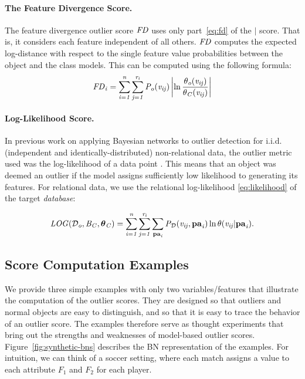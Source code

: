 {\paragraph{The Feature Divergence Score.}
The feature divergence outlier score $\it{FD}$ uses only part~\eqref{eq:fd} of the $\mid$ score. That is, it considers each feature independent of all others.  $\it{FD}$ computes the expected log-distance with respect to  the single feature value probabilities between the object and the class models. This can be computed using the following formula:
\begin{equation}
\it{FD}_{i}	=\sum_{i=1}^{n}\sum_{j=1}^{r_{i}} P_{o}( v_{ij}) \left|\ln \frac{\theta_{o}( v_{ij})}{\theta_{C}( v_{ij})}\right|
\end{equation}


\paragraph{Log-Likelihood Score.} 

In previous work on applying Bayesian networks to outlier detection for i.i.d. (independent and identically-distributed) non-relational data, the outlier metric used was the log-likelihood of a data point \cite{Cansado2008}. This means that an object was deemed an outlier if the model assigns sufficiently low likelihood to generating its features. For relational data, we use the relational log-likelihood \eqref{eq:likelihood} of the target {\em database}:

\begin{equation} \label{eq:loglikelihood-score}
\it{LOG}(\mathcal{D}_{o},B_{C},\boldsymbol{\theta}_{C}) =   \sum_{i=1}^{n}\sum_{j=1}^{r_{i}} \sum_{\mathbf{pa}_{i}}P_{\mathcal{D}}(v_{ij},\mathbf{pa}_{i})\ln \theta(v_{ij}|\mathbf{pa}_{i}).
\end{equation}




\subsection{Score Computation Examples} \label{sec:divergence-examples} 
			
			
			We provide three simple examples with only two variables/features that illustrate the computation of the outlier scores. They are designed so that outliers and normal objects are easy to distinguish, and so that it is easy to trace the behavior of an outlier score.
			The examples therefore serve as thought experiments that bring out the strengths and weaknesses of model-based outlier scores. 
			Figure~\ref{fig:synthetic-bns} describes the BN representation of the examples. For intuition, we can think of a soccer setting, where each match assigns a value to each attribute $F_{1}$ and $F_{2}$ for each player. 
			
}
